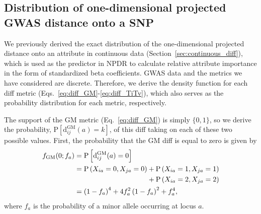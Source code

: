 \documentclass[aos]{imsart}
\begin{document}
\begin{table}[H]
\begin{adjustbox}{center}
	\end{adjustbox}
\end{table}

\subsection{Distribution of one-dimensional projected GWAS distance onto a SNP}\label{sec:GWAS_diff}

We previously derived the exact distribution of the one-dimensional projected distance onto an attribute in continuous data (Section~\ref{sec:continuous_diff}), which is used as the predictor in NPDR to calculate relative attribute importance in the form of standardized beta coefficients. GWAS data and the metrics we have considered are discrete. Therefore, we derive the density function for each diff metric (Eqs.~\ref{eq:diff_GM}-\ref{eq:diff_TiTv}), which also serves as the probability distribution for each metric, respectively.

The support of the GM metric (Eq.~\ref{eq:diff_GM}) is simply $\{0,1\}$, so we derive the probability, $\text{P}\left[\text{d}^\text{GM}_{ij}(a) = k\right]$, of this diff taking on each of these two possible values. First, the probability that the GM diff is equal to zero is given by
%
\begin{equation}\label{eq:probGM0}
\begin{aligned}
f_\text{GM}(0;f_a) &= \text{P}\left[\text{d}^\text{GM}_{ij}(a) = 0\right] \\
&= \text{P}\left(X_{ia}=0,X_{ja}=0\right) + \text{P}\left(X_{ia}=1,X_{ja}=1\right) \\
& \hspace{3.64cm} + \text{P}\left(X_{ia}=2,X_{ja}=2\right) \\
&= \left(1 - f_a\right)^4 + 4 f^2_a \left(1 - f_a\right)^2 + f^4_a,
\end{aligned}
\end{equation}
%
where $f_a$ is the probability of a minor allele occurring at locus $a$.
\end{document}
